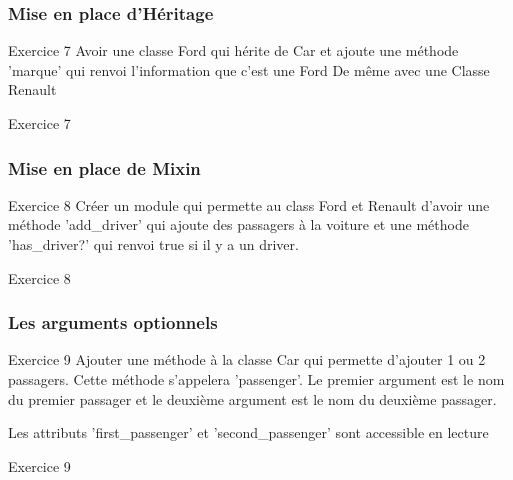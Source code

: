 \documentclass{beamer}
\begin{document}
\begin{frame}
  \frametitle{Mise en place d'H\'eritage}
  \begin{block}{Exercice 7}
  Avoir une classe Ford qui h\'erite de Car et ajoute une m\'ethode 'marque' qui renvoi l'information que c'est une Ford
  De même avec une Classe Renault
\end{block}
\end{frame}

\begin{frame}
  \begin{beamerboxesrounded}{Exercice 7}
    
  \end{beamerboxesrounded}
\end{frame}

\begin{frame}
  \frametitle{Mise en place de Mixin}
  \begin{block}{Exercice 8}
  Cr\'eer un module qui permette au class Ford et Renault d'avoir une m\'ethode 'add\_driver'
  qui ajoute des passagers à la voiture et une m\'ethode 'has\_driver?' qui renvoi true si il y a un driver.
\end{block}
\end{frame}
\begin{frame}
  \begin{beamerboxesrounded}{Exercice 8}
    
  \end{beamerboxesrounded}
\end{frame}

\begin{frame}
  \frametitle{Les arguments optionnels}
  \begin{block}{Exercice 9}
  Ajouter une m\'ethode à la classe Car qui permette d'ajouter 1 ou 2 passagers. Cette m\'ethode s'appelera 'passenger'. Le premier argument est le nom du premier passager et le deuxième argument est le nom du deuxième passager.

  Les attributs 'first\_passenger' et 'second\_passenger' sont accessible en lecture
\end{block}
\end{frame}

\begin{frame}
  \begin{beamerboxesrounded}{Exercice 9}
    
  \end{beamerboxesrounded}
\end{frame}
\end{document}
